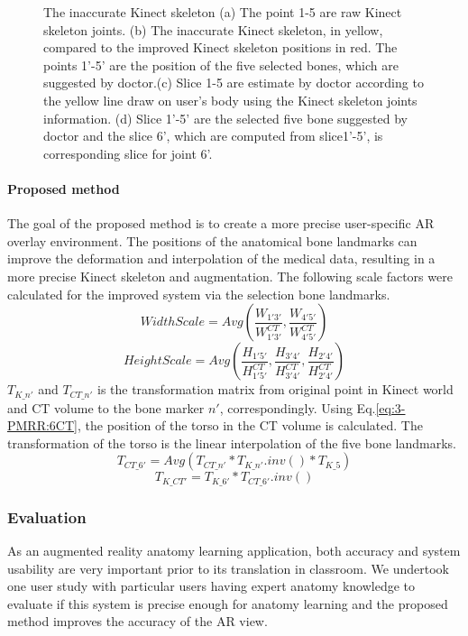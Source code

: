\begin{figure}
{	}
	\caption{The inaccurate Kinect skeleton (a) The point 1-5 are raw Kinect skeleton joints. (b) The inaccurate Kinect skeleton, in yellow, compared to the improved Kinect skeleton positions in red. The points 1'-5' are the position of the five selected bones, which are suggested by doctor.(c) Slice 1-5 are estimate by doctor according to the yellow line draw on user's body using the Kinect skeleton joints information. (d) Slice 1'-5' are the selected five bone suggested by doctor and the slice 6', which are computed from slice1'-5', is corresponding slice for joint 6'.}
	\label{fig:3-PRMM:5Joints}
\end{figure} 

\paragraph{Proposed method} The goal of the proposed method is to create a more precise user-specific AR overlay environment. The positions of the anatomical bone landmarks can improve the deformation and interpolation of the medical data, resulting in a more precise Kinect skeleton and augmentation. The following scale factors were calculated for the improved system via the selection bone landmarks. 
\begin{equation}
WidthScale = Avg(\frac{{{W_{1'3'}}}}{{W_{1'3'}^{CT}}},\frac{{{W_{4'5'}}}}{{W_{4'5'}^{CT}}})
\end{equation}
\begin{equation}
HeightScale = Avg(\frac{{{H_{1'5'}}}}{{H_{1'5'}^{CT}}},\frac{{{H_{3'4'}}}}{{H_{3'4'}^{CT}}},\frac{{{H_{2'4'}}}}{{H_{2'4'}^{CT}}})
\end{equation}
$T_{K\_n'}$ and $T_{CT\_n'}$ is the transformation matrix from original point in Kinect world and CT volume to the bone marker $n'$, correspondingly. Using Eq.\ref{eq:3-PMRR:6CT}, the position of the torso in the CT volume is calculated. The transformation of the torso is the linear interpolation of the five bone landmarks.
\begin{equation} \label{eq:3-PMRR:6CT}
T_{CT\_6'} = Avg(T_{CT\_n'} * T_{K\_n'}.inv() * T_{K\_5 })
\end{equation}
\begin{equation}
T_{K\_CT'} = T_{K\_6'} * T_{CT\_6'}.inv()
\end{equation}

\subsubsection{Evaluation}
As an augmented reality anatomy learning application, both accuracy and system usability are very important prior to its translation in classroom. We undertook one user study with particular users having expert anatomy knowledge to evaluate if this system is precise enough for anatomy learning and the proposed method improves the accuracy of the AR view.

